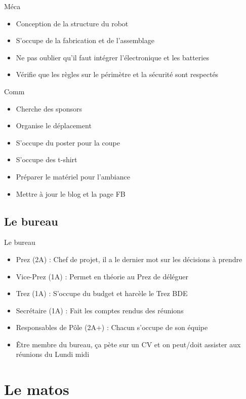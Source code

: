\documentclass{beamer}
\begin{document}
\begin{frame}{Méca}
	\begin{itemize}
		\item Conception de la structure du robot
		\item S'occupe de la fabrication et de l'assemblage
		\item Ne pas oublier qu'il faut intégrer l'électronique et les batteries
		\item Vérifie que les règles sur le périmètre et la sécurité sont respectés
	\end{itemize}
\end{frame}

\begin{frame}{Comm}
	\begin{itemize}
		\item Cherche des sponsors
		\item Organise le déplacement
		\item S'occupe du poster pour la coupe
		\item S'occupe des t-shirt
		\item Préparer le matériel pour l'ambiance
		\item Mettre à jour le blog et la page FB
	\end{itemize}
\end{frame}

\subsection{Le bureau}
\begin{frame}{Le bureau}
	\begin{itemize}
		\item Prez (2A) : Chef de projet, il a le dernier mot sur les décisions à prendre
		\item Vice-Prez (1A) : Permet en théorie au Prez de déléguer
		\item Trez (1A) : S'occupe du budget et harcèle le Trez BDE
		\item Secrétaire (1A) : Fait les comptes rendus des réunions
		\item Responsables de Pôle (2A+) : Chacun s'occupe de son équipe
		\item \^Etre membre du bureau, ça pète sur un CV et on peut/doit assister aux réunions du Lundi midi 
	\end{itemize}
\end{frame}


\section{Le matos}
\end{document}
